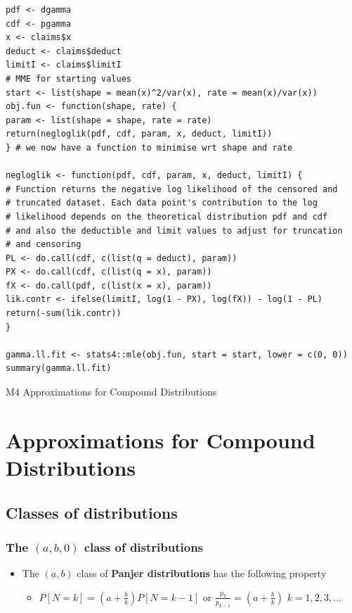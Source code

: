 \documentclass{article}
\begin{document}
\begin{lstlisting}
pdf <- dgamma
cdf <- pgamma
x <- claims$x
deduct <- claims$deduct
limitI <- claims$limitI
# MME for starting values
start <- list(shape = mean(x)^2/var(x), rate = mean(x)/var(x))
obj.fun <- function(shape, rate) {
param <- list(shape = shape, rate = rate)
return(negloglik(pdf, cdf, param, x, deduct, limitI))
} # we now have a function to minimise wrt shape and rate

negloglik <- function(pdf, cdf, param, x, deduct, limitI) {
# Function returns the negative log likelihood of the censored and
# truncated dataset. Each data point's contribution to the log
# likelihood depends on the theoretical distribution pdf and cdf
# and also the deductible and limit values to adjust for truncation
# and censoring
PL <- do.call(cdf, c(list(q = deduct), param))
PX <- do.call(cdf, c(list(q = x), param))
fX <- do.call(pdf, c(list(x = x), param))
lik.contr <- ifelse(limitI, log(1 - PX), log(fX)) - log(1 - PL)
return(-sum(lik.contr))
}

gamma.ll.fit <- stats4::mle(obj.fun, start = start, lower = c(0, 0))
summary(gamma.ll.fit)
\end{lstlisting}


\pagebreak

\begin{center}
    \Large{M4 Approximations for Compound Distributions}
\end{center}
    

\section{Approximations for Compound Distributions}

\subsection{Classes of distributions}
\subsubsection{The $(a,b,0)$ class of distributions}

\begin{itemize}
    \item The $(a,b)$ class of \textbf{Panjer distributions} has the following property
    \begin{itemize}
        \item $P[N=k] = (a+ \frac{b}{k})P[N=k-1]$ \hspace{0.5cm} or \hspace{0.5cm} $\frac{p_k}{p_{k-1}} = (a +\frac{b}{k})$ \hspace{0.5cm} $k = 1,2,3,...$
    \end{itemize}
\end{itemize}
\end{document}

